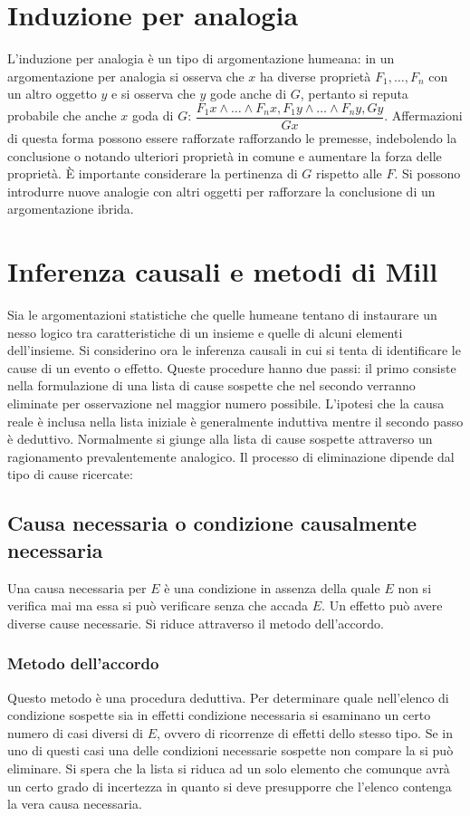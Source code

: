 \section{Induzione per analogia}
L'induzione per analogia \`e un tipo di argomentazione humeana: in un argomentazione per analogia si osserva che $x$ ha diverse propriet\`a $F_1,\dots,F_n$
con un altro oggetto $y$ e si osserva che $y$ gode anche di $G$, pertanto si reputa probabile che anche $x$ goda di $G$: $\dfrac{F_1x\land\dots\land F_nx, 
F_1y\land\dots\land F_ny, Gy}{Gx}$. Affermazioni di questa forma possono essere rafforzate rafforzando le premesse, indebolendo la conclusione o notando 
ulteriori propriet\`a in comune e aumentare la forza delle propriet\`a. \`E importante considerare la pertinenza di $G$ rispetto alle $F$. Si possono 
introdurre nuove analogie con altri oggetti per rafforzare la conclusione di un argomentazione ibrida.
\section{Inferenza causali e metodi di Mill}
Sia le argomentazioni statistiche che quelle humeane tentano di instaurare un nesso logico tra caratteristiche di un insieme e quelle di alcuni elementi
dell'insieme. Si considerino ora le inferenza causali in cui si tenta di identificare le cause di un evento o effetto. Queste procedure hanno due passi:
il primo consiste nella formulazione di una lista di cause sospette che nel secondo verranno eliminate per osservazione nel maggior numero possibile.
L'ipotesi che la causa reale \`e inclusa nella lista iniziale \`e generalmente induttiva mentre il secondo passo \`e deduttivo. Normalmente si giunge alla
lista di cause sospette attraverso un ragionamento prevalentemente analogico. Il processo di eliminazione dipende dal tipo di cause ricercate: 
\subsection{Causa necessaria o condizione causalmente necessaria}
Una causa necessaria per $E$ \`e una condizione in assenza della quale $E$ non si verifica mai ma essa si pu\`o verificare senza che accada $E$. Un effetto 
pu\`o avere diverse cause necessarie. Si riduce attraverso il metodo dell'accordo.
\subsubsection{Metodo dell'accordo}
Questo metodo \`e una procedura deduttiva. Per determinare quale nell'elenco di condizione sospette sia in effetti condizione necessaria si esaminano un
certo numero di casi diversi di $E$, ovvero di ricorrenze di effetti dello stesso tipo. Se in uno di questi casi una delle condizioni necessarie sospette 
non compare la si pu\`o eliminare. Si spera che la lista si riduca ad un solo elemento che comunque avr\`a un certo grado di incertezza in quanto 
si deve presupporre che l'elenco contenga la vera causa necessaria. 
